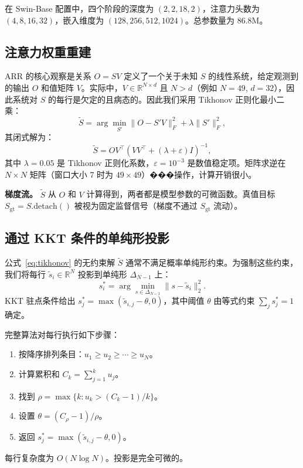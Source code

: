 \documentclass[preprint,12pt]{elsarticle}
\begin{document}
在 Swin-Base 配置中，四个阶段的深度为 $(2, 2, 18, 2)$，注意力头数为 $(4, 8, 16, 32)$，嵌入维度为 $(128, 256, 512, 1024)$。总参数量为 86.8M。

\subsection{注意力权重重建}

ARR 的核心观察是关系 $O = SV$ 定义了一个关于未知 $S$ 的线性系统，给定观测到的输出 $O$ 和值矩阵 $V$。实际中，$V \in \mathbb{R}^{N \times d}$ 且 $N > d$（例如 $N = 49$, $d = 32$），因此系统对 $S$ 的每行是欠定的且病态的。因此我们采用 Tikhonov 正则化最小二乘：
\begin{equation}
\tilde{S} = \arg\min_{S'} \|O - S'V\|_F^2 + \lambda \|S'\|_F^2,
\end{equation}
其闭式解为：
\begin{equation}\label{eq:tikhonov}
\tilde{S} = OV^\top \left(VV^\top + (\lambda + \varepsilon)I\right)^{-1},
\end{equation}
其中 $\lambda = 0.05$ 是 Tikhonov 正则化系数，$\varepsilon = 10^{-3}$ 是数值稳定项。矩阵求逆在 $N \times N$ 矩阵（窗口大小 7 时为 $49 \times 49$）���操作，计算开销很小。

\textbf{梯度流。} $\tilde{S}$ 从 $O$ 和 $V$ 计算得到，两者都是模型参数的可微函数。真值目标 $S_{\mathrm{gt}} = S.\mathrm{detach}()$ 被视为固定监督信号（梯度不通过 $S_{\mathrm{gt}}$ 流动）。

\subsection{通过 KKT 条件的单纯形投影}

公式~\eqref{eq:tikhonov} 的无约束解 $\tilde{S}$ 通常不满足概率单纯形约束。为强制这些约束，我们将每行 $\tilde{s}_i \in \mathbb{R}^N$ 投影到单纯形 $\Delta_{N-1}$ 上：
\begin{equation}
s_i^* = \arg\min_{s \in \Delta_{N-1}} \|s - \tilde{s}_i\|_2^2.
\end{equation}
KKT 驻点条件给出 $s_j^* = \max(\tilde{s}_{i,j} - \theta, 0)$，其中阈值 $\theta$ 由等式约束 $\sum_j s_j^* = 1$ 确定。

完整算法对每行执行如下步骤：
\begin{enumerate}
    \item 按降序排列条目：$u_1 \geq u_2 \geq \cdots \geq u_N$。
    \item 计算累积和 $C_k = \sum_{j=1}^{k} u_j$。
    \item 找到 $\rho = \max\{k : u_k > (C_k - 1)/k\}$。
    \item 设置 $\theta = (C_\rho - 1)/\rho$。
    \item 返回 $s_j^* = \max(\tilde{s}_{i,j} - \theta, 0)$。
\end{enumerate}
每行复杂度为 $O(N \log N)$。投影是完全可微的。
\end{document}
